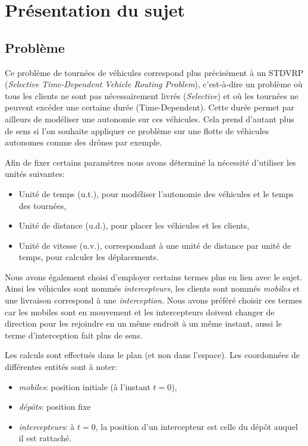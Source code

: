 \chapter{Présentation du sujet}
	\section{Problème}
		Ce problème de tournées de véhicules correspond plus précisément à un STDVRP (\emph{Selective Time-Dependent Vehicle Routing Problem}), c'est-à-dire un problème où tous les clients ne sont pas nécessairement livrés (\emph{Selective}) et où les tournées ne peuvent excéder une certaine durée (Time-Dependent). Cette durée permet par ailleurs de modéliser une autonomie sur ces véhicules. Cela prend d'autant plus de sens si l'on souhaite appliquer ce problème sur une flotte de véhicules autonomes comme des drônes par exemple.

		Afin de fixer certains paramètres nous avons déterminé la nécessité d'utiliser les unités suivantes:
		\begin{itemize}
			\item Unité de temps (u.t.), pour modéliser l'autonomie des véhicules et le temps des tournées,
			\item Unité de distance (u.d.), pour placer les véhicules et les clients,
			\item Unité de vitesse (u.v.), correspondant à une unité de distance par unité de temps, pour calculer les déplacements.
		\end{itemize}

		Nous avons également choisi d'employer certains termes plus en lien avec le sujet. Ainsi les véhicules sont nommés \emph{intercepteurs}, les clients sont nommés \emph{mobiles} et une livraison correspond à une \emph{interception}. Nous avons préféré choisir ces termes car les mobiles sont en mouvement et les intercepteurs doivent changer de direction pour les rejoindre en un même endroit à un même instant, aussi le terme d'interception fait plus de sens.

		Les calculs sont effectués dans le plan (et non dans l'espace). Les coordonnées de différentes entités sont à noter:
		\begin{itemize}
			\item \emph{mobiles}: position initiale (à l'instant $t=0$),
			\item \emph{dépôts}: position fixe
			\item \emph{intercepteurs}: à $t=0$, la position d'un intercepteur est celle du dépôt auquel il est rattaché.
		\end{itemize}

